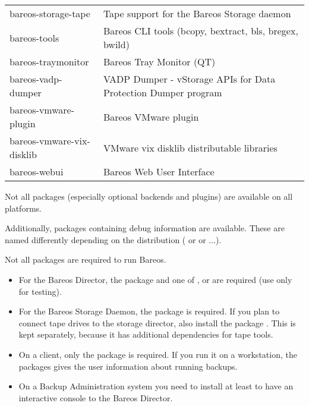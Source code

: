 \begin{center}
\begin{tabular}{ | l | l | }
bareos-storage-tape & Tape support for the Bareos Storage daemon \\
bareos-tools & Bareos CLI tools (bcopy, bextract, bls, bregex, bwild) \\
bareos-traymonitor & Bareos Tray Monitor (QT) \\
bareos-vadp-dumper & VADP Dumper - vStorage APIs for Data Protection Dumper program \\
bareos-vmware-plugin & Bareos VMware plugin \\
bareos-vmware-vix-disklib & VMware vix disklib distributable libraries \\
bareos-webui & Bareos Web User Interface \\
\hline
\end{tabular}
\end{center}

Not all packages (especially optional backends and plugins) are available on all platforms.

Additionally, packages containing debug information are available.
These are named differently depending on the distribution ( or  or  $\ldots$).

Not all packages are required to run Bareos.

\begin{itemize}
    \item For the Bareos Director, the package  and one of ,  or  are required (use  only for testing).

    \item For the Bareos Storage Daemon, the package  is required. If you plan to connect tape drives to the storage director, also install the package . This is kept separately, because it has additional dependencies  for tape tools.

    \item On a client, only the package  is required. If you run it on a workstation, the packages  gives the user information about running backups.

    \item On a Backup Administration system you need to install at least  to have an interactive console to the Bareos Director.

\end{itemize}



